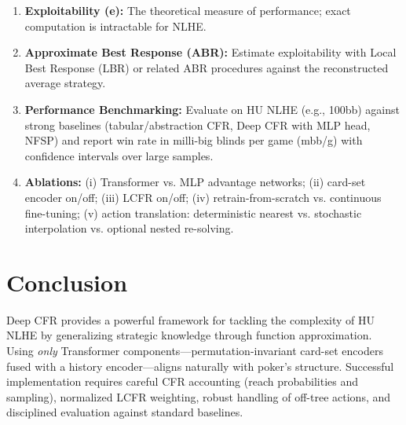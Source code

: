 \documentclass[11pt,a4paper]{article}
\begin{document}
\begin{enumerate}
    \item \textbf{Exploitability (e):} The theoretical measure of performance; exact computation is intractable for NLHE.
    \item \textbf{Approximate Best Response (ABR):} Estimate exploitability with Local Best Response (LBR) or related ABR procedures against the reconstructed average strategy.
    \item \textbf{Performance Benchmarking:} Evaluate on HU NLHE (e.g., 100bb) against strong baselines (tabular/abstraction CFR, Deep CFR with MLP head, NFSP) and report win rate in milli-big blinds per game (mbb/g) with confidence intervals over large samples.
    \item \textbf{Ablations:} (i) Transformer vs. MLP advantage networks; (ii) card-set encoder on/off; (iii) LCFR on/off; (iv) retrain-from-scratch vs. continuous fine-tuning; (v) action translation: deterministic nearest vs. stochastic interpolation vs. optional nested re-solving.
\end{enumerate}

\section{Conclusion}

Deep CFR provides a powerful framework for tackling the complexity of HU NLHE by generalizing strategic knowledge through function approximation. Using \emph{only} Transformer components—permutation-invariant card-set encoders fused with a history encoder—aligns naturally with poker's structure. Successful implementation requires careful CFR accounting (reach probabilities and sampling), normalized LCFR weighting, robust handling of off-tree actions, and disciplined evaluation against standard baselines.
\end{document}
